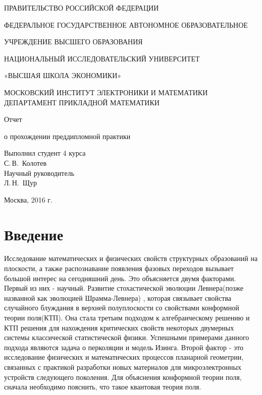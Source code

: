 \documentclass[12pt,a4paper]{article}
\begin{document}
	
	\begin{titlepage}
		\begin{center}
			\large
			ПРАВИТЕЛЬСТВО РОССИЙСКОЙ ФЕДЕРАЦИИ
			
			ФЕДЕРАЛЬНОЕ ГОСУДАРСТВЕННОЕ АВТОНОМНОЕ ОБРАЗОВАТЕЛЬНОЕ 
			
			УЧРЕЖДЕНИЕ ВЫСШЕГО ОБРАЗОВАНИЯ
			
			НАЦИОНАЛЬНЫЙ ИССЛЕДОВАТЕЛЬСКИЙ УНИВЕРСИТЕТ
			
			«ВЫСШАЯ ШКОЛА ЭКОНОМИКИ»\\[12pt]
			\vspace{0.25cm}
			
			МОСКОВСКИЙ ИНСТИТУТ ЭЛЕКТРОНИКИ И МАТЕМАТИКИ
			ДЕПАРТАМЕНТ ПРИКЛАДНОЙ МАТЕМАТИКИ
			
			\vspace{2cm}
			
			{\large Отчет 
				
				о прохождении преддипломной практики}
			\bigskip
		\end{center}
		\vfill
		
		\hfill\begin{minipage}{0.35\textwidth}
			Выполнил студент 4 курса\\
			С.\,В.~Колотев\\
			
			
			Научный руководитель\\
			Л.\,Н.~Щур\\
		\end{minipage}%
		\bigskip
		\vfill
		
		
		\begin{center}
			Москва, 2016 г.
		\end{center}
	\end{titlepage}
	
	\renewcommand\contentsname{Оглавление}
	\section{Введение}
	
	\par Исследование математических и физических свойств структурных образований на плоскости, а также распознавание появления фазовых переходов вызывает большой интерес на сегодняшний день. Это объясняется двумя факторами. Первый из них - научный. Развитие стохастической эволюции Левнера(позже названной как эволюцией Шрамма-Левнера) \cite{shram}, которая связывает свойства случайного блуждания в верхней полуплоскости со свойствами конформной теории поля(КТП)\cite{cft}. Она стала третьим подходом к алгебраическому решению\cite{stat_model} и КТП\cite{conf_algeb} решения для нахождения критических свойств некоторых двумерных системы классической статистической физики. Успешными примерами данного подхода являются задача о перколяции\cite{harm_expl,crit_perc} и модель Изинга\cite{conf_inv}. Второй фактор - это исследование физических и математических процессов планарной геометрии, связанных с практикой разработки новых материалов для микроэлектронных устройств следующего поколения\cite{microvawe}. Для объяснения конформной теории поля, сначала необходимо пояснить, что такое квантовая теория поля. 
	
\end{document}
